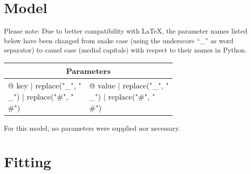 \clearpage

\section{Model}

Please note: Due to better compatibility with \LaTeX{}, the parameter names listed below have been changed from snake case (using the underscore \enquote{\_} as word separator) to camel case (medial capitals) with respect to their names in Python.

\vspace*{1ex}
\begin{tabular}{ll}
\toprule
\multicolumn{2}{c}{\textbf{Parameters}}
\\
\midrule
{@ key | replace("_", "\\_") | replace("#", "\\#") } & {@ value | replace("_", "\\_") | replace("#", "\\#") }
\\
\bottomrule
\end{tabular}
\vspace*{1ex}
For this model, no parameters were supplied nor necessary.


\section{Fitting}


